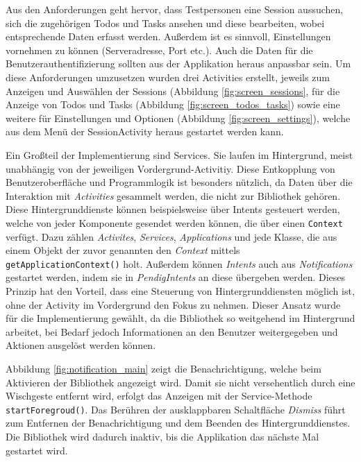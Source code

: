Aus den Anforderungen geht hervor, dass Testpersonen eine Session aussuchen, sich die zugehörigen Todos und Tasks ansehen und diese bearbeiten, wobei entsprechende Daten erfasst werden.
Außerdem ist es sinnvoll, Einstellungen vornehmen zu können (Serveradresse, Port etc.). Auch die Daten für die Benutzerauthentifizierung sollten aus der Applikation heraus anpassbar sein.
Um diese Anforderungen umzusetzen wurden drei Activities erstellt, jeweils zum Anzeigen und Auswählen der Sessions (Abbildung \ref{fig:screen_sessions}, für die Anzeige von Todos und Tasks (Abbildung \ref{fig:screen_todos_tasks}) sowie eine weitere für Einstellungen und Optionen (Abbildung \ref{fig:screen_settings}), welche aus dem Menü der SessionActivity heraus gestartet werden kann.


Ein Großteil der Implementierung sind Services.
Sie laufen im Hintergrund, meist unabhängig von der jeweiligen Vordergrund-Activitiy.
Diese Entkopplung von Benutzeroberfläche und Programmlogik ist besonders nützlich, da Daten über die Interaktion mit \emph{Activities} gesammelt werden, die nicht zur Bibliothek gehören.
Diese Hintergrunddienste können beispielsweise über Intents gesteuert werden, welche von jeder Komponente gesendet werden können, die über einen \texttt{Context} verfügt.
Dazu zählen \emph{Activites}, \emph{Services}, \emph{Applications} und jede Klasse, die aus einem Objekt der zuvor genannten den \emph{Context} mittels \texttt{getApplicationContext()} holt.
Außerdem können \emph{Intents} auch aus \emph{Notifications} gestartet werden, indem sie in \emph{PendigIntents} an diese übergeben werden.
Dieses Prinzip hat den Vorteil, dass eine Steuerung von Hintergrunddiensten möglich ist, ohne der Activity im Vordergrund den Fokus zu nehmen.
Dieser Ansatz wurde für die Implementierung gewählt, da die Bibliothek so weitgehend im Hintergrund arbeitet, bei Bedarf jedoch Informationen an den Benutzer weitergegeben und Aktionen ausgelöst werden können.

Abbildung \ref{fig:notification_main} zeigt die Benachrichtigung, welche beim Aktivieren der Bibliothek angezeigt wird. 
Damit sie nicht versehentlich durch eine Wischgeste entfernt wird, erfolgt das Anzeigen mit der Service-Methode \texttt{startForegroud()}.
Das Berühren der ausklappbaren Schaltfläche \emph{Dismiss} führt zum Entfernen der Benachrichtigung und dem Beenden des Hintergrunddienstes.
Die Bibliothek wird dadurch inaktiv, bis die Applikation das nächste Mal gestartet wird.

